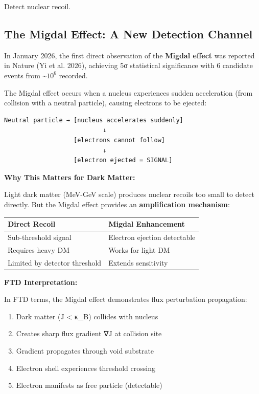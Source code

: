 \documentclass[
  11pt,
  letterpaper,
  twoside,
  openright]{book}
\providecommand{\tightlist}{%
  \setlength{\itemsep}{0pt}\setlength{\parskip}{0pt}}
\begin{document}
Detect nuclear recoil.

\subsection{The Migdal Effect: A New Detection
Channel}\label{the-migdal-effect-a-new-detection-channel}

In January 2026, the first direct observation of the \textbf{Migdal
effect} was reported in Nature (Yi et al. 2026), achieving 5σ
statistical significance with 6 candidate events from
\textasciitilde{}\(10^6\) recorded.

The Migdal effect occurs when a nucleus experiences sudden acceleration
(from collision with a neutral particle), causing electrons to be
ejected:

\begin{verbatim}
Neutral particle → [nucleus accelerates suddenly]
                           ↓
                   [electrons cannot follow]
                           ↓
                   [electron ejected = SIGNAL]
\end{verbatim}

\textbf{Why This Matters for Dark Matter:}

Light dark matter (MeV-GeV scale) produces nuclear recoils too small to
detect directly. But the Migdal effect provides an \textbf{amplification
mechanism}:

\begin{longtable}[]{@{}ll@{}}
\toprule\noalign{}
Direct Recoil & Migdal Enhancement \\
\midrule\noalign{}
\endhead
\bottomrule\noalign{}
\endlastfoot
Sub-threshold signal & Electron ejection detectable \\
Requires heavy DM & Works for light DM \\
Limited by detector threshold & Extends sensitivity \\
\end{longtable}

\textbf{FTD Interpretation:}

In FTD terms, the Migdal effect demonstrates flux perturbation
propagation:

\begin{enumerate}
\def\labelenumi{\arabic{enumi}.}
\tightlist
\item
  Dark matter (\textbar J\textbar{} \textless{} κ\_B) collides with
  nucleus
\item
  Creates sharp flux gradient ∇J at collision site
\item
  Gradient propagates through void substrate
\item
  Electron shell experiences threshold crossing
\item
  Electron manifests as free particle (detectable)
\end{enumerate}
\end{document}
